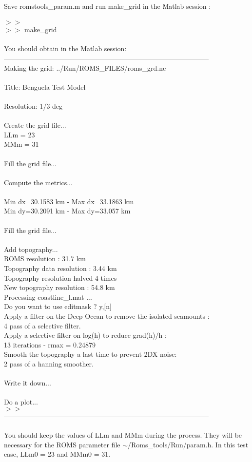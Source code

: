 Save romstools\_param.m and run make\_grid in the Matlab session :
\\ \\ 
$>>$\\
$>>$ make\_grid \\
 \\
You should obtain in the Matlab session:\\
------------------------------------------------------------------------------------------\\
Making the grid: ../Run/ROMS\_FILES/roms\_grd.nc \\
\\
Title: Benguela Test Model \\
\\
Resolution: 1/3 deg \\
\\
Create the grid file... \\
LLm = 23 \\
MMm = 31 \\
\\
Fill the grid file... \\
\\
Compute the metrics... \\
\\
Min dx=30.1583 km - Max dx=33.1863 km \\
Min dy=30.2091 km - Max dy=33.057 km \\
\\
Fill the grid file... \\
\\
Add topography... \\
  ROMS resolution : 31.7 km \\
  Topography data resolution : 3.44 km \\
  Topography resolution halved 4 times \\
   New topography resolution : 54.8 km \\
Processing coastline\_l.mat ... \\
Do you want to use editmask ? y,[n]\\
 Apply a filter on the Deep Ocean to remove the isolated seamounts :\\
   4 pass of a selective filter.\\
 Apply a selective filter on log(h) to reduce grad(h)/h :\\
   13 iterations - rmax = 0.24879\\
 Smooth the topography a last time to prevent 2DX noise:\\
   2 pass of a hanning smoother.\\
\\
 Write it down...\\
\\
 Do a plot...\\
 $>>$\\
 ------------------------------------------------------------------------------------------\\
\\
You should keep the values of LLm and MMm during the process.
They will be necessary for the ROMS parameter file  
$\sim$/Roms\_tools/Run/param.h. In this test case,
LLm0 = 23 and MMm0 = 31. 

